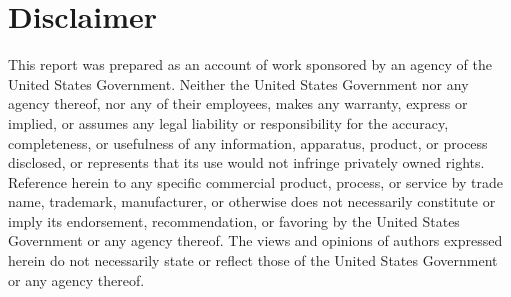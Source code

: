 \chapter*{Disclaimer}
This report was prepared as an account of work sponsored by an agency of the United States Government.  Neither the United States Government nor any agency thereof, nor any of their employees, makes any warranty, express or implied, or assumes any legal liability or responsibility for the accuracy, completeness, or usefulness of any information, apparatus, product, or process disclosed, or represents that its use would not infringe privately owned rights.  Reference herein to any specific commercial product, process, or service by trade name, trademark, manufacturer, or otherwise does not necessarily constitute or imply its endorsement, recommendation, or favoring by the United States Government or any agency thereof.  The views and opinions of authors expressed herein do not necessarily state or reflect those of the United States Government or any agency thereof.
